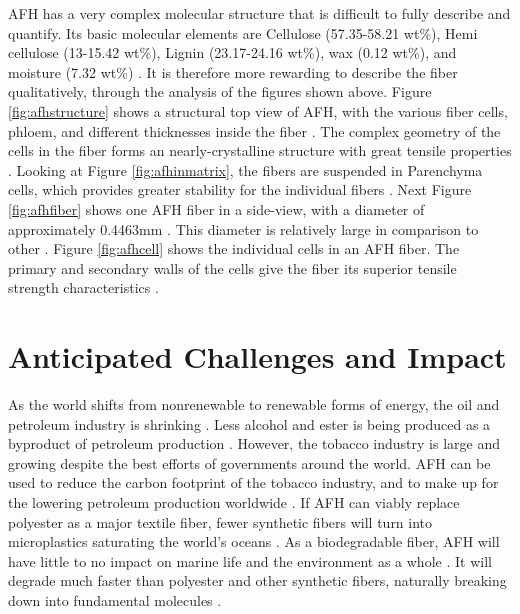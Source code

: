 \documentclass{article}
\begin{document}
AFH has a very complex molecular structure that is difficult to fully describe and quantify. Its basic molecular elements are Cellulose (57.35-58.21 wt\%), Hemi cellulose (13-15.42 wt\%), Lignin (23.17-24.16 wt\%), wax (0.12 wt\%), and moisture (7.32 wt\%) \autocite{afhfiber}. It is therefore more rewarding to describe the fiber qualitatively, through the analysis of the figures shown above. Figure \ref{fig:afhstructure} shows a structural top view of AFH, with the various fiber cells, phloem, and different thicknesses inside the fiber \autocite{afhfiber}. The complex geometry of the cells in the fiber forms an nearly-crystalline structure with great tensile properties \autocite{afhfiber}. Looking at Figure \ref{fig:afhinmatrix}, the fibers are suspended in Parenchyma cells, which provides greater stability for the individual fibers \autocite{afhfiber}. Next Figure \ref{fig:afhfiber} shows one AFH fiber in a side-view, with a diameter of approximately 0.4463mm \autocite{afhfiber}. This diameter is relatively large in comparison to other . Figure \ref{fig:afhcell} shows the individual cells in an AFH fiber. The primary and secondary walls of the cells give the fiber its superior tensile strength characteristics \autocite{afhfiber}.

\section{Anticipated Challenges and Impact}

As the world shifts from nonrenewable to renewable forms of energy, the oil and petroleum industry is shrinking \autocite{iucn}. Less alcohol and ester is being produced as a byproduct of petroleum production \autocite{iucn}\autocite{craftechindustries}. However, the tobacco industry is large and growing despite the best efforts of governments around the world. AFH can be used to reduce the carbon footprint of the tobacco industry, and to make up for the lowering petroleum production worldwide \autocite{afhfiber}. If AFH can viably replace polyester as a major textile fiber, fewer synthetic fibers will turn into microplastics saturating the world's oceans \autocite{microplasticrelease}\autocite{gesamp}. As a biodegradable fiber, AFH will have little to no impact on marine life and the environment as a whole \autocite{gesamp}\autocite{afhfiber}. It will degrade much faster than polyester and other synthetic fibers, naturally breaking down into fundamental molecules \autocite{naturalfiberprogressreport}.
\end{document}
